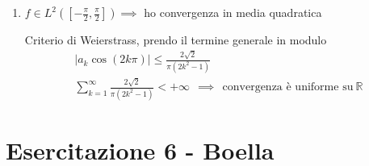 \begin{enumerate}
per $x=\frac{\pi }{2}$\begin{equation*}
\begin{aligned}
F\left(\frac{\pi }{2}\right) & =\cos\left(\sqrt{2} \cdotp \frac{\pi }{2}\right) =\textcolor[rgb]{0.25,0.46,0.02}{\cos\left(\frac{\pi }{\sqrt{2}}\right)}\\
F\left(\frac{\pi }{2}\right) & =\frac{\sqrt{2}}{\pi }\sin\left(\frac{\pi }{\sqrt{2}}\right) +\sum\limits ^{\infty }_{k=1} a_{k}( -1)^{k}\\
 & =\textcolor[rgb]{0.74,0.06,0.88}{\frac{\sqrt{2}}{\pi }\sin\left(\frac{\pi }{\sqrt{2}}\right)}\textcolor[rgb]{0.96,0.65,0.14}{-\frac{2\sqrt{2}\sin\left(\frac{\pi }{\sqrt{2}}\right)}{\pi }}\sum\limits ^{\infty }_{k=1}\frac{( -1)^{k}( -1)^{k}}{\left( 2k^{2} -1\right)}\\
 & \\
\implies \ \ \sum\limits ^{\infty }_{k=1}\frac{1}{\left( 2k^{2} -1\right)} & =\frac{\textcolor[rgb]{0.25,0.46,0.02}{\cos\left(\frac{\pi }{\sqrt{2}}\right)} -\textcolor[rgb]{0.74,0.06,0.88}{\frac{\sqrt{2}}{\pi }\sin\left(\frac{\pi }{\sqrt{2}}\right)}}{\textcolor[rgb]{0.96,0.65,0.14}{-\frac{2\sqrt{2}\sin\left(\frac{\pi }{\sqrt{2}}\right)}{\pi }}} =-\frac{\textcolor[rgb]{0.25,0.46,0.02}{\cos\left(\frac{\pi }{\sqrt{2}}\right)}}{\textcolor[rgb]{0.96,0.65,0.14}{\frac{2\sqrt{2}\sin\left(\frac{\pi }{\sqrt{2}}\right)}{\pi }}} +\frac{\textcolor[rgb]{0.74,0.06,0.88}{\frac{\sqrt{2}}{\pi }\sin\left(\frac{\pi }{\sqrt{2}}\right)}}{\textcolor[rgb]{0.96,0.65,0.14}{\frac{2\sqrt{2}\sin\left(\frac{\pi }{\sqrt{2}}\right)}{\pi }}}\\
 & =-\frac{\pi }{2\sqrt{2}}\cot\left(\frac{\pi }{\sqrt{2}}\right) +\frac{1}{2}
\end{aligned}
\end{equation*}
\item $f\in L^{2}\left(\left[ -\frac{\pi }{2} ,\frac{\pi }{2}\right]\right) \implies $ ho convergenza in media quadratica

Criterio di Weierstrass, prendo il termine generale in modulo\begin{gather*}
| a_{k}\cos( 2k\pi )| \leqslant \frac{2\sqrt{2}}{\pi \left( 2k^{2} -1\right)}\\
\sum\limits ^{\infty }_{k=1}\frac{2\sqrt{2}}{\pi \left( 2k^{2} -1\right)} < +\infty \ \ \implies \ \ \text{convergenza è uniforme su} \ \mathbb{R}
\end{gather*}
\end{enumerate}
\chapter{Esercitazione 6 - Boella}
\ParteEsercizi
\Esercizio{}

